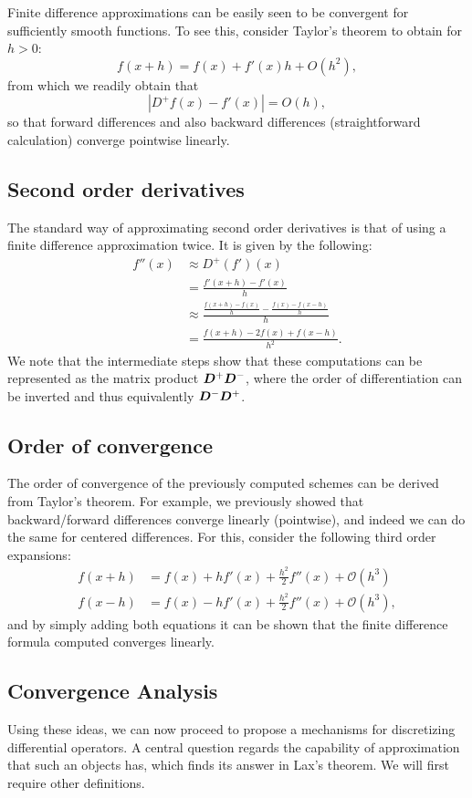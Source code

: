 \documentclass{article}
\newcommand{\mat}{\matrixsym}
\begin{document}
Finite difference approximations can be easily seen to be convergent for sufficiently smooth functions. To see this, consider Taylor's theorem to obtain for $h>0$:
    $$ f(x+ h) = f(x) + f'(x)h + O(h^2), $$
from which we readily obtain that 
    $$ | D^+f(x) - f'(x) | = O(h), $$
    so that forward differences and also backward differences (straightforward calculation) converge pointwise linearly. 

\subsection{Second order derivatives}
The standard way of approximating second order derivatives is that of using a finite difference approximation twice. It is given by the following: 
$$ \begin{aligned}
    f''(x) &\approx D^+(f')(x) \\
           &=\frac{f'(x+h) - f'(x)}{h} \\
           &\approx\frac{\frac{f(x+h) - f(x)}{h} - \frac{f(x) - f(x-h)}{h}}{h} \\
           &= \frac{f(x+h) - 2f(x) + f(x-h)}{h^2}.
    \end{aligned}
$$
We note that the intermediate steps show that these computations can be represented as the matrix product $\mat D^+ \mat D^-$, where the order of differentiation can be inverted and thus equivalently $\mat D^- \mat D^+$. 
\subsection{Order of convergence}
The order of convergence of the previously computed schemes can be derived from Taylor's theorem. For example, we previously showed that backward/forward differences converge linearly (pointwise), and indeed we can do the same for centered differences. For this, consider the following third order expansions:
    $$
    \begin{aligned}
        f(x+h) &= f(x) + hf'(x) + \frac {h^2} 2 f''(x) + \mathcal O(h^3) \\
        f(x-h) &= f(x) - hf'(x) + \frac {h^2} 2 f''(x) + \mathcal O(h^3),
    \end{aligned}
    $$
and by simply adding both equations it can be shown that the finite difference formula computed converges linearly.


\subsection{Convergence Analysis}
Using these ideas, we can now proceed to propose a mechanisms for discretizing differential operators. A central question regards the capability of approximation that such an objects has, which finds its answer in Lax's theorem. We will first require other definitions. 
\end{document}
